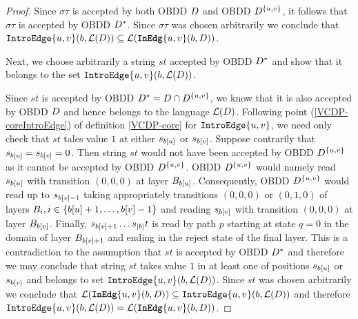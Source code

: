 \begin{proof}
    Since $\sigma\tau$ is accepted by both OBDD $D$ and OBDD $D^{\{u,v\}}$, it follows that $\sigma\tau$ is accepted by OBDD $D^*$. Since $\sigma\tau$ was chosen arbitrarily we conclude that $\texttt{IntroEdge}\{u,v\}(b,\mathcal{L}(D)) \subseteq \mathcal{L}(\texttt{\textbf{InEdg}}\{u,v\}(b,D))$.

    Next, we choose arbitrarily a string $st$ accepted by OBDD $D^*$ and show that it belongs to the set $\texttt{IntroEdge}\{u,v\}(b,\mathcal{L}(D))$.

    Since $st$ is accepted by OBDD $D^* = D \cap D^{\{u,v\}}$, we know that it is also accepted by OBDD $D$ and hence belongs to the language $\mathcal{L}(D)$. Following point (\ref{VCDP-coreIntroEdge}) of  definition \ref{VCDP-core} for $\texttt{IntroEdge}\{u,v\}$, we need only check that $st$ tales value $1$ at either $s_{b[u]}$ or $s_{b[v]}$. Suppose contrarily that $s_{b[u]} = s_{b[v]} = 0$. Then string $st$ would not have been accepted by OBDD $D^{\{u,v\}}$ as it cannot be accepted by OBDD $D^{\{u,v\}}$. OBDD $D^{\{u,v\}}$ would namely read $s_{b[u]}$ with transition $(0,0,0)$ at layer $B_{b[u]}$. Consequently, OBDD $D^{\{u,v\}}$ would read up to $s_{b[v] - 1}$ taking appropriately transitions $(0,0,0)$ or $(0,1,0)$ of layers $B_i, i \in \{b[u]+1,\ldots,b[v]-1\}$ and reading $s_{b[v]}$ with transition $(0,0,0)$ at layer $B_{b[v]}$. Finally, $s_{b[v]+1}\dots s_{|b|}t$ is read by path $p$ starting at state $q=0$ in the domain of layer $B_{b[v]+1}$ and ending in the reject state of the final layer. This is a contradiction to the assumption that $st$ is accepted by OBDD $D^*$ and therefore we may conclude that string $st$ takes value $1$ in at least one of positions $s_{b[u]}$ or $s_{b[v]}$ and belongs to set $\texttt{IntroEdge}\{u,v\}(b,\mathcal{L}(D))$. Since $st$ was chosen arbitrarily we conclude that $\mathcal{L}(\texttt{\textbf{InEdg}}\{u,v\}(b,D)) \subseteq \texttt{IntroEdge}\{u,v\}(b, \mathcal{L}(D))$ and therefore $\texttt{IntroEdge}\{u,v\}(b,\mathcal{L}(D)) = \mathcal{L}(\texttt{\textbf{InEdg}}\{u,v\}(b,D))$.
    
\end{proof}

